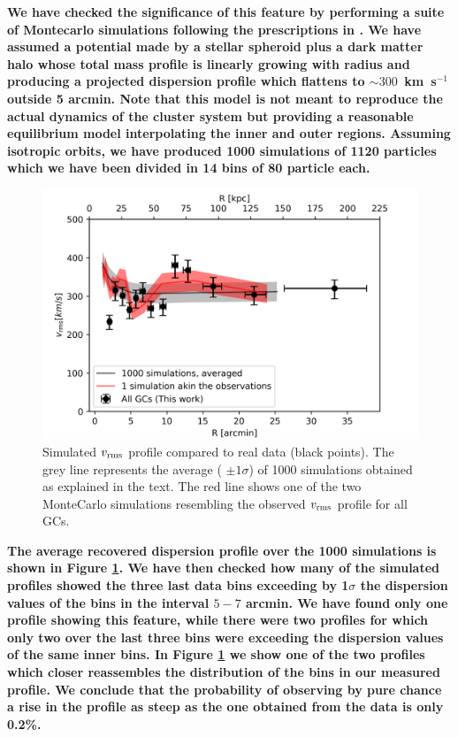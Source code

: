 \documentclass[usenatbib]{mnras}
\newcommand{\kms}{\mbox{\,km~s$^{-1}$}}
\begin{document}
\textbf{We have checked the significance of this feature by performing a suite of
Montecarlo simulations following the prescriptions in \citet{Napolitano01}.
We have assumed a potential made by a stellar spheroid plus a dark matter halo
whose total mass profile is linearly growing with radius and producing a projected
dispersion profile which flattens to $\sim 300$ \kms outside 5 arcmin. 
Note that this model is not meant to reproduce
the actual dynamics of the cluster system but providing a reasonable equilibrium
model interpolating the inner and outer regions. Assuming isotropic orbits,
we have produced 1000 simulations of 1120 particles which we have been divided in 
14 bins of 80 particle each.}

\begin{figure}
\centering
\includegraphics[width=\columnwidth]{figures/sims.png}
\caption{Simulated $v_{\rm rms}$ profile compared to real data  (black points). The grey line 
represents the average ( $\pm 1 \sigma$) of 1000 simulations obtained as explained in the text. 
The red line shows one of the two MonteCarlo simulations resembling the observed $v_{\rm rms}$ profile
for all GCs.}
\label{fig:sims}
\end{figure}

\textbf{The average recovered dispersion profile over the 1000 simulations is shown in
Figure \ref{fig:sims}. We have then checked how many of the simulated
profiles showed the three last data bins exceeding by 1$\sigma$ the dispersion
values of the bins in the interval $5-7$ arcmin. We have found only one profile
showing this feature, while there were two profiles for which only two over the
last three bins were exceeding the dispersion values of the same inner bins.
In Figure \ref{fig:sims} we show one of the two profiles which closer reassembles the
distribution of the bins in our measured profile. We conclude that the probability of 
observing by pure chance a rise in the profile as steep as the one obtained from the data is only 0.2\%.}
\end{document}
